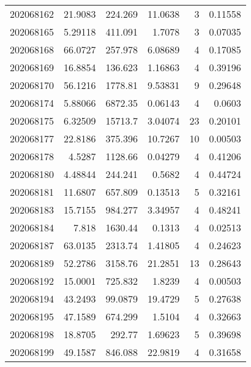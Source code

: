 \begin{tabular}{rrrrrr}
 202068162 &         21.9083  &      224.269  &           11.0638  &           3 & 0.11558 \\
 202068165 &          5.29118 &      411.091  &            1.7078  &           3 & 0.07035 \\
 202068168 &         66.0727  &      257.978  &            6.08689 &           4 & 0.17085 \\
 202068169 &         16.8854  &      136.623  &            1.16863 &           4 & 0.39196 \\
 202068170 &         56.1216  &     1778.81   &            9.53831 &           9 & 0.29648 \\
 202068174 &          5.88066 &     6872.35   &            0.06143 &           4 & 0.0603  \\
 202068175 &          6.32509 &    15713.7    &            3.04074 &          23 & 0.20101 \\
 202068177 &         22.8186  &      375.396  &           10.7267  &          10 & 0.00503 \\
 202068178 &          4.5287  &     1128.66   &            0.04279 &           4 & 0.41206 \\
 202068180 &          4.48844 &      244.241  &            0.5682  &           4 & 0.44724 \\
 202068181 &         11.6807  &      657.809  &            0.13513 &           5 & 0.32161 \\
 202068183 &         15.7155  &      984.277  &            3.34957 &           4 & 0.48241 \\
 202068184 &          7.818   &     1630.44   &            0.1313  &           4 & 0.02513 \\
 202068187 &         63.0135  &     2313.74   &            1.41805 &           4 & 0.24623 \\
 202068189 &         52.2786  &     3158.76   &           21.2851  &          13 & 0.28643 \\
 202068192 &         15.0001  &      725.832  &            1.8239  &           4 & 0.00503 \\
 202068194 &         43.2493  &       99.0879 &           19.4729  &           5 & 0.27638 \\
 202068195 &         47.1589  &      674.299  &            1.5104  &           4 & 0.32663 \\
 202068198 &         18.8705  &      292.77   &            1.69623 &           5 & 0.39698 \\
 202068199 &         49.1587  &      846.088  &           22.9819  &           4 & 0.31658 \\

\end{tabular}
